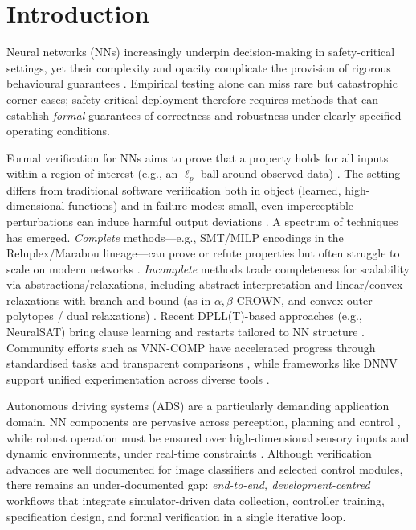 \section{Introduction}

Neural networks (NNs) increasingly underpin decision-making in safety-critical settings, yet their complexity and opacity complicate the provision of rigorous behavioural guarantees \cite{huang2020survey,liu2021algorithms,JMLR:v25:23-0119}. Empirical testing alone can miss rare but catastrophic corner cases; safety-critical deployment therefore requires methods that can establish \emph{formal} guarantees of correctness and robustness under clearly specified operating conditions.

Formal verification for NNs aims to prove that a property holds for all inputs within a region of interest (e.g., an $\ell_p$-ball around observed data) \cite{katz2019marabou}. The setting differs from traditional software verification both in object (learned, high-dimensional functions) and in failure modes: small, even imperceptible perturbations can induce harmful output deviations \cite{carlini2019evaluating}. A spectrum of techniques has emerged. \emph{Complete} methods—e.g., SMT/MILP encodings in the Reluplex/Marabou lineage—can prove or refute properties but often struggle to scale on modern networks \cite{katz2017reluplex,katz2019marabou,ehlers2017planet,tjeng2019milp}. \emph{Incomplete} methods trade completeness for scalability via abstractions/relaxations, including abstract interpretation and linear/convex relaxations with branch-and-bound (as in $\alpha,\beta$-CROWN, and convex outer polytopes / dual relaxations) \cite{gehr2018ai2,singh2019abstract,zhang2018efficient,xu2021fast,wang2021beta,zhang2019crownibp,wong2018provable,raghunathan2018certified,zhou2024scalable}. Recent DPLL(T)-based approaches (e.g., NeuralSAT) bring clause learning and restarts tailored to NN structure \cite{duong2024dpllt}. Community efforts such as VNN-COMP have accelerated progress through standardised tasks and transparent comparisons \cite{bak2021second,brix2023fourth,brix2024fifth}, while frameworks like DNNV support unified experimentation across diverse tools \cite{shriver2021dnnv}.

Autonomous driving systems (ADS) are a particularly demanding application domain. NN components are pervasive across perception, planning and control \cite{bojarski2016end}, while robust operation must be ensured over high-dimensional sensory inputs and dynamic environments, under real-time constraints \cite{tran2020verification,dreossi2019verifai,koopman2016challenges}. Although verification advances are well documented for image classifiers and selected control modules, there remains an under-documented gap: \emph{end-to-end, development-centred} workflows that integrate simulator-driven data collection, controller training, specification design, and formal verification in a single iterative loop.

